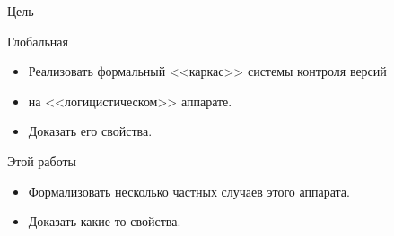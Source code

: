 \begin{frame}{Цель}
  \begin{block}{Глобальная}
  \begin{itemize}
  \item Реализовать формальный <<каркас>> системы контроля версий
  \item на <<логицистическом>> аппарате.
  \item Доказать его свойства.
  \end{itemize}
  \end{block}

  \begin{block}{Этой работы}
  \begin{itemize}
  \item Формализовать несколько частных случаев этого аппарата.
  \item Доказать какие-то свойства.
  \end{itemize}
  \end{block}
\end{frame}
